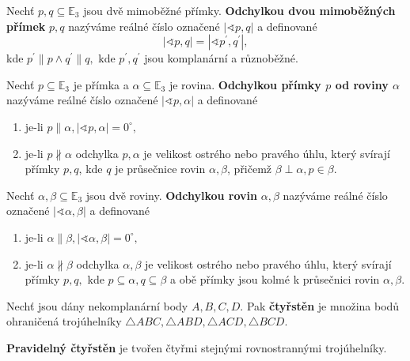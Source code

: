 \begin{definition}
    Nechť $p,q\subseteq \mathbb E_3$ jsou dvě mimoběžné přímky. \textbf{Odchylkou
    dvou mimoběžných přímek} $p,q$ nazýváme reálné číslo označené $|\sphericalangle
    p,q|$ a definované
    $$|\sphericalangle p,q| = |\sphericalangle p^\prime, q^\prime|,$$
    kde $p^\prime \parallel p \land q^\prime \parallel q,$ kde $p^\prime, q^\prime$
    jsou komplanární a různoběžné.
\end{definition}

\begin{definition}
    Nechť $p\subseteq \mathbb E_3$ je přímka a $\alpha\subseteq \mathbb E_3$ je
    rovina. \textbf{Odchylkou přímky $p$ od roviny $\alpha$} nazýváme
    reálné číslo označené $|\sphericalangle
    p,\alpha|$ a definované
    \begin{enumerate}[$i.$]
    \item je-li $p\parallel \alpha, |\sphericalangle p,\alpha|=0^\circ,$
    \item je-li $p\nparallel \alpha$ odchylka $p,\alpha$ je velikost ostrého nebo
        pravého úhlu,
        který svírají přímky $p,q$, kde $q$ je průsečnice rovin $\alpha, \beta$,
        přičemž $\beta \perp \alpha, p\in\beta.$
    \end{enumerate}
\end{definition}

\begin{definition}
    Nechť $\alpha,\beta\subseteq \mathbb E_3$ jsou dvě roviny. \textbf{Odchylkou
    rovin} $\alpha, \beta$ nazýváme reálné číslo označené $|\sphericalangle
    \alpha, \beta|$ a definované
    \begin{enumerate}[$i.$]
    \item je-li $\alpha\parallel \beta, |\sphericalangle \alpha,\beta|=0^\circ,$
   	\item je-li $\alpha\nparallel \beta$ odchylka $\alpha,\beta$ je velikost
        ostrého nebo pravého úhlu,
        který svírají přímky $p,q,$ kde $p\subseteq \alpha, q\subseteq \beta$ a obě
        přímky jsou kolmé k průsečnici rovin $\alpha, \beta.$
    \end{enumerate}
\end{definition}

\begin{definition}
    Nechť jsou dány nekomplanární body $A,B,C,D.$ Pak
  \textbf{čtyřstěn} je množina bodů ohraničená trojúhelníky $\triangle ABC, \triangle
  ABD, \triangle ACD, \triangle BCD.$

  \textbf{Pravidelný čtyřstěn} je tvořen čtyřmi stejnými rovnostrannými trojúhelníky.
\end{definition}

